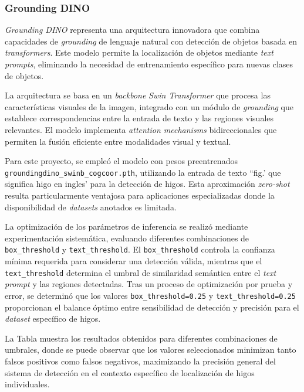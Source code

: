 \subsubsection{Grounding DINO}

\emph{Grounding DINO} representa una arquitectura innovadora que combina capacidades de \emph{grounding} de lenguaje natural con detección de objetos basada en \emph{transformers}. Este modelo permite la localización de objetos mediante \emph{text prompts}, eliminando la necesidad de entrenamiento específico para nuevas clases de objetos.

La arquitectura se basa en un \emph{backbone} \emph{Swin Transformer} que procesa las características visuales de la imagen, integrado con un módulo de \emph{grounding} que establece correspondencias entre la entrada de texto y las regiones visuales relevantes. El modelo implementa \emph{attention mechanisms} bidireccionales que permiten la fusión eficiente entre modalidades visual y textual.

Para este proyecto, se empleó el modelo  con pesos preentrenados \texttt{groundingdino\_swinb\_cogcoor.pth}, utilizando la entrada de texto ``fig.' que significa higo en ingles' para la detección de higos. Esta aproximación \emph{zero-shot} resulta particularmente ventajosa para aplicaciones especializadas donde la disponibilidad de \emph{datasets} anotados es limitada.

La optimización de los parámetros de inferencia se realizó mediante experimentación sistemática, evaluando diferentes combinaciones de \texttt{box\_threshold} y \texttt{text\_threshold}. El \texttt{box\_threshold} controla la confianza mínima requerida para considerar una detección válida, mientras que el \texttt{text\_threshold} determina el umbral de similaridad semántica entre el \emph{text prompt} y las regiones detectadas. Tras un proceso de optimización por prueba y error, se determinó que los valores \texttt{box\_threshold=0.25} y \texttt{text\_threshold=0.25} proporcionan el balance óptimo entre sensibilidad de detección y precisión para el \emph{dataset} específico de higos.


La Tabla muestra los resultados obtenidos para diferentes combinaciones de umbrales, donde se puede observar que los valores seleccionados minimizan tanto falsos positivos como falsos negativos, maximizando la precisión general del sistema de detección en el contexto específico de localización de higos individuales.

